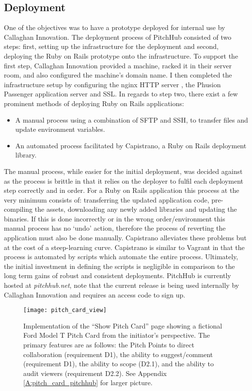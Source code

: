 \subsection{Deployment}
One of the objectives was to have a prototype deployed for internal use by Callaghan Innovation. The deployment process of PitchHub consisted of two steps: first, setting up the infrastructure for the deployment and second, deploying the Ruby on Rails prototype onto the infrastructure. To support the first step, Callaghan Innovation provided a machine, racked it in their server room, and also configured the machine's domain name. I then completed the infrastructure setup by configuring the nginx HTTP server \cite{nginx2:online}, the Phusion Passenger application server \cite{phusionPassenger:online} and SSL. In regards to step two, there exist a few prominent methods of deploying Ruby on Rails applications:
\begin{itemize}
    \item A manual process using a combination of SFTP and SSH, to transfer files and update environment variables.
    \item An automated process facilitated by Capistrano, a Ruby on Rails deployment library.
\end{itemize}

The manual process, while easier for the initial deployment, was decided against as the process is brittle in that it relies on the deployer to fulfil each deployment step correctly and in order. For a Ruby on Rails application this process at the very minimum consists of: transferring the updated application code, pre-compiling the assets, downloading any newly added libraries and updating the binaries. If this is done incorrectly or in the wrong order/environment this manual process has no `undo' action, therefore the process of reverting the application must also be done manually. Capistrano alleviates these problems but at the cost of a steep-learning curve. Capistrano is similar to Vagrant in that the process is automated by scripts which automate the entire process. Ultimately, the initial investment in defining the scripts is negligible in comparison to the long term gains of robust and consistent deployments. PitchHub is currently hosted at \textit{pitchhub.net}, note that the current release is being used internally by Callaghan Innovation and requires an access code to sign up.

\begin{figure}[ht]
    \centering
    \texttt{[image: pitch\_card\_view]}
    \caption{Implementation of the ``Show Pitch Card'' page showing a fictional Ford Model T Pitch Card from the initiator's perspective. The primary features are as follows: the Pitch Points to direct collaboration (requirement D1), the ability to suggest/comment (requirement D1), the ability to scope (D2.1), and the ability to audit viewers (requirement D2.2). See Appendix \ref{A:pitch_card_pitchhub} for larger picture.}
    \label{fig:show_pitch_card}
\end{figure}

